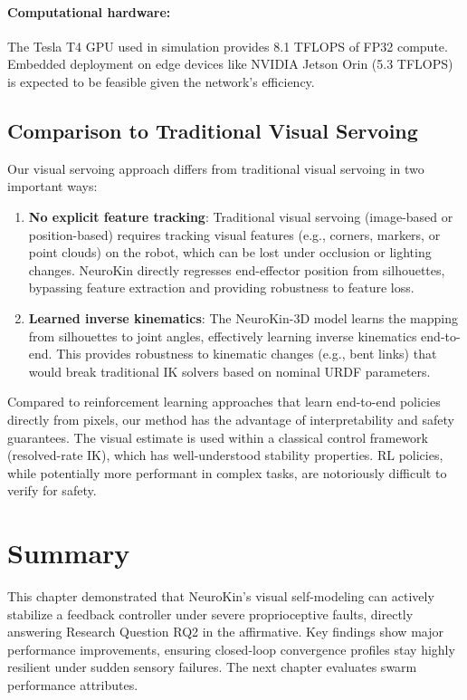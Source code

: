\documentclass[12pt,a4paper,oneside]{report}
\begin{document}
\paragraph{Computational hardware:} The Tesla T4 GPU used in simulation provides 8.1 TFLOPS of FP32 compute. Embedded deployment on edge devices like NVIDIA Jetson Orin (5.3 TFLOPS) is expected to be feasible given the network's efficiency.

\subsection{Comparison to Traditional Visual Servoing}

Our visual servoing approach differs from traditional visual servoing in two important ways:
\begin{enumerate}
    \item \textbf{No explicit feature tracking}: Traditional visual servoing (image-based or position-based) requires tracking visual features (e.g., corners, markers, or point clouds) on the robot, which can be lost under occlusion or lighting changes. NeuroKin directly regresses end-effector position from silhouettes, bypassing feature extraction and providing robustness to feature loss.
    \item \textbf{Learned inverse kinematics}: The NeuroKin-3D model learns the mapping from silhouettes to joint angles, effectively learning inverse kinematics end-to-end. This provides robustness to kinematic changes (e.g., bent links) that would break traditional IK solvers based on nominal URDF parameters.
\end{enumerate}

Compared to reinforcement learning approaches that learn end-to-end policies directly from pixels, our method has the advantage of interpretability and safety guarantees. The visual estimate is used within a classical control framework (resolved-rate IK), which has well-understood stability properties. RL policies, while potentially more performant in complex tasks, are notoriously difficult to verify for safety.

\section{Summary}

This chapter demonstrated that NeuroKin's visual self-modeling can actively stabilize a feedback controller under severe proprioceptive faults, directly answering Research Question RQ2 in the affirmative. Key findings show major performance improvements, ensuring closed-loop convergence profiles stay highly resilient under sudden sensory failures. The next chapter evaluates swarm performance attributes.
\end{document}
